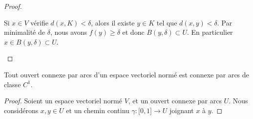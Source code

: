 \begin{proof}
\begin{subproof}
		Si \( x\in V\) vérifie \( d(x,K)<\delta\), alors il existe \( y\in K\) tel que \( d(x,y)<\delta\). Par minimalité de \( \delta\), nous avons \( f(y)\geq \delta\) et donc \( B(y,\delta)\subset U\). En particulier \( x\in B(y,\delta)\subset U\).
	\end{subproof}
\end{proof}

\begin{proposition}       \label{PROPooGRXXooWcZyJG}
	Tout ouvert connexe par arcs d'un espace vectoriel normé est connexe par arcs de classe \( C^1\).
\end{proposition}

\begin{proof}
	Soient un espace vectoriel normé \( V\), et un ouvert connexe par arcs \( U\). Nous considérons \( x,y\in U\) et un chemin continu \( \gamma\colon \mathopen[ 0 , 1 \mathclose]\to U\) joignant \( x\) à \( y\).


\end{proof}
